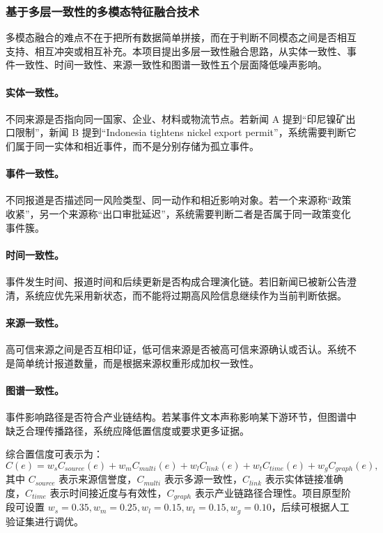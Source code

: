 \documentclass[12pt,a4paper]{article}
\begin{document}
\subsubsection{基于多层一致性的多模态特征融合技术}

多模态融合的难点不在于把所有数据简单拼接，而在于判断不同模态之间是否相互支持、相互冲突或相互补充。本项目提出多层一致性融合思路，从实体一致性、事件一致性、时间一致性、来源一致性和图谱一致性五个层面降低噪声影响。

\paragraph{实体一致性。}不同来源是否指向同一国家、企业、材料或物流节点。若新闻 A 提到“印尼镍矿出口限制”，新闻 B 提到“Indonesia tightens nickel export permit”，系统需要判断它们属于同一实体和相近事件，而不是分别存储为孤立事件。

\paragraph{事件一致性。}不同报道是否描述同一风险类型、同一动作和相近影响对象。若一个来源称“政策收紧”，另一个来源称“出口审批延迟”，系统需要判断二者是否属于同一政策变化事件簇。

\paragraph{时间一致性。}事件发生时间、报道时间和后续更新是否构成合理演化链。若旧新闻已被新公告澄清，系统应优先采用新状态，而不能将过期高风险信息继续作为当前判断依据。

\paragraph{来源一致性。}高可信来源之间是否互相印证，低可信来源是否被高可信来源确认或否认。系统不是简单统计报道数量，而是根据来源权重形成加权一致性。

\paragraph{图谱一致性。}事件影响路径是否符合产业链结构。若某事件文本声称影响某下游环节，但图谱中缺乏合理传播路径，系统应降低置信度或要求更多证据。

综合置信度可表示为：
\begin{equation}
C(e)=w_s C_{source}(e)+w_m C_{multi}(e)+w_l C_{link}(e)+w_t C_{time}(e)+w_g C_{graph}(e),
\end{equation}
其中 $C_{source}$ 表示来源信誉度，$C_{multi}$ 表示多源一致性，$C_{link}$ 表示实体链接准确度，$C_{time}$ 表示时间接近度与有效性，$C_{graph}$ 表示产业链路径合理性。项目原型阶段可设置 $w_s=0.35,w_m=0.25,w_l=0.15,w_t=0.15,w_g=0.10$，后续可根据人工验证集进行调优。
\end{document}
